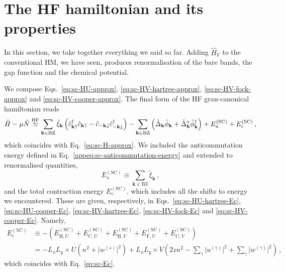 \section{The HF hamiltonian and its properties}\label{sec:sc-hf-hamiltonian}

In this section, we take together everything we said so far. Adding $\hat H_V$ to the conventional HM, we have seen, produces renormalisation of the bare bands, the gap function and the chemical potential. 

We compose Eqs.~\eqref{eq:sc-HU-approx}, \eqref{eq:sc-HV-hartree-approx}, \eqref{eq:sc-HV-fock-approx} and \eqref{eq:sc-HV-cooper-approx}. The final form of the HF gran-canonical hamiltonian reads
\begin{equation}\label{appeq:sc-H-approx}
	\hat H - \mu \hat N \stackrel{\mathrm{HF}}{\simeq} \sum_{\mathbf{k}\in\mathrm{BZ}} \tilde{\xi}_\mathbf{k} \left(
	\hat c_{\mathbf{k}\uparrow}^\dagger
	\hat c_{\mathbf{k}\uparrow} -
	\hat c_{-\mathbf{k}\downarrow}
	\hat c_{-\mathbf{k}\downarrow}^\dagger
	\right) - \sum_{\mathbf{k}\in\mathrm{BZ}} \left(
	\tilde{\Delta}_\mathbf{k}
	\hat \phi_\mathbf{k} + \tilde{\Delta}_\mathbf{k}^* \hat \phi_\mathbf{k}^\dagger
	\right) + E_\mathrm{a}^{(\mathrm{SC})} + E_\mathrm{c}^{(\mathrm{SC})} \, ,	
\end{equation}
which coincides with Eq.~\eqref{eq:sc-H-approx}.
We included the anticommutation energy defined in Eq.~\eqref{appeq:sc-anticommutation-energy} and extended to renormalised quantities,
\[
	E_\mathrm{a}^{(\mathrm{SC})} \equiv \sum_{\mathbf{k}\in\mathrm{BZ}} \tilde{\xi}_\mathbf{k} \, ,
\]
and the total contraction energy $E_\mathrm{c}^{(\mathrm{SC})}$, which includes all the shifts to energy we encountered. These are given, respectively, in Eqs.~\eqref{eq:sc-HU-hartree-Ec}, \eqref{eq:sc-HU-cooper-Ec}, \eqref{eq:sc-HV-hartree-Ec}, \eqref{eq:sc-HV-fock-Ec} and \eqref{eq:sc-HV-cooper-Ec}. Namely,
\begin{align}\label{appeq:sc-Ec}
	E_\mathrm{c}^{(\mathrm{SC})} &\equiv -
	\left(
	E_{\mathrm{H},U}^{(\mathrm{SC})} +		E_{\mathrm{C},U}^{(\mathrm{SC})} +
	E_{\mathrm{H},V}^{(\mathrm{SC})} + E_{\mathrm{F},V}^{(\mathrm{SC})} + E_{\mathrm{C},V}^{(\mathrm{SC})}
	\right) \nonumber \\
	&= -L_x L_y \times U \left(
	n^2 + \big|
	w^{(s)}
	\big|^2
	\right) + L_x L_y \times V \left(
	2zn^2 - \sum_\gamma \big|
	u^{(\gamma)}
	\big|^2 + \sum_\gamma \big|
	w^{(\gamma)}
	\big|^2
	\right) \, ,
\end{align}
which coincides with Eq.~\eqref{eq:sc-Ec}.

